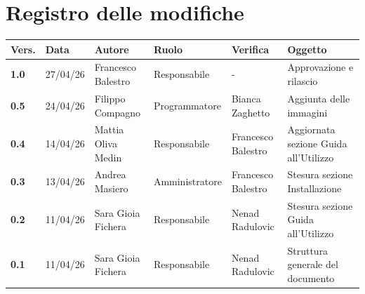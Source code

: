 \documentclass[a4paper,12pt]{article}
\begin{document}
    

    \section*{Registro delle modifiche} {
        \begin{table}[h!]
                \begin{tabularx}{\textwidth}{|l|l|l|l|L|L|}
                \hline
                \textbf{Vers.} & \textbf{Data} & \textbf{Autore} & \textbf{Ruolo} & \textbf{Verifica} & \textbf{Oggetto} \\
                \hline
                \textbf{1.0} & 27/04/26 & Francesco Balestro & Responsabile & - & Approvazione e rilascio\\
                \hline
                \textbf{0.5} & 24/04/26 & Filippo Compagno & Programmatore & Bianca Zaghetto & Aggiunta delle immagini\\
                \hline
                \textbf{0.4} & 14/04/26 & Mattia Oliva Medin & Responsabile & Francesco Balestro & Aggiornata sezione Guida all'Utilizzo\\
                \hline
                \textbf{0.3} & 13/04/26 & Andrea Masiero & Amministratore & Francesco Balestro & Stesura sezione Installazione\\
                \hline
                \textbf{0.2} & 11/04/26 & Sara Gioia Fichera & Responsabile & Nenad Radulovic & Stesura sezione Guida all'Utilizzo\\
                \hline
                \textbf{0.1} & 11/04/26 & Sara Gioia Fichera & Responsabile & Nenad Radulovic & Struttura generale del documento\\
                \hline
            \end{tabularx}
        \end{table}
    }
    \newpage
    
    \tableofcontents
    \newpage

    \listoffigures
    \newpage
    
\end{document}

